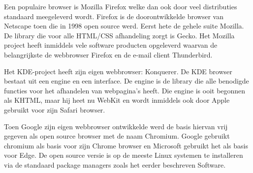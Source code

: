 Een populaire browser is Mozilla Firefox welke dan ook door veel distributies standaard meegeleverd wordt. Firefox is de doorontwikkelde browser van Netscape toen die in 1998 open source werd. Eerst hete de gehele suite Mozilla. De library die voor alle HTML/CSS afhandeling zorgt is Gecko. Het Mozilla project heeft inmiddels vele software producten opgeleverd waarvan de belangrijkste de webbrowser Firefox en de e-mail client Thunderbird.

Het KDE-project heeft zijn eigen webbrowser: Konquerer. De KDE browser bestaat uit een engine en een interface. De engine is de library die alle benodigde functies voor het afhandelen van webpagina's heeft. Die engine is ooit begonnen als KHTML, maar hij heet nu WebKit en wordt inmiddels ook door Apple gebruikt voor zijn Safari browser.

Toen Google zijn eigen webbrowser ontwikkelde werd de basis hiervan vrij gegeven als open source
browser met de naam Chromium. Google gebruikt chromium als basis voor zijn Chrome browser en Microsoft gebruikt het als basis voor Edge. De open source versie is op de meeste Linux systemen te installeren via de standaard package managers zoals het eerder beschreven Software.
